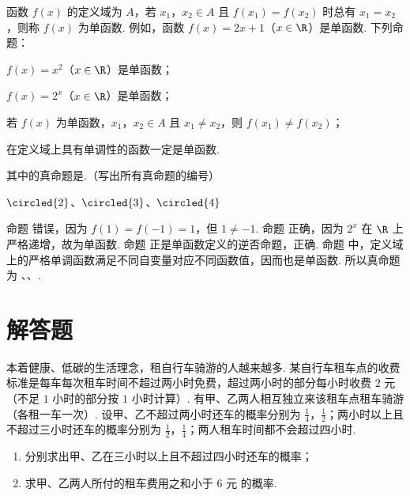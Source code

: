 \begin{problem}
函数 \(f(x)\) 的定义域为 \(A\)，若 \(x_1\)，\(x_2 \in A\) 且 \(f(x_1) = f(x_2)\) 时总有 \(x_1 = x_2\)，则称 \(f(x)\) 为单函数. 例如，函数 \(f(x) = 2x + 1\)（\(x \in \R\)）是单函数. 下列命题：

\begin{circlelist}
\item \(f(x) = x^2\)（\(x \in \R\)）是单函数；
\item \(f(x) = 2^x\)（\(x \in \R\)）是单函数；
\item 若 \(f(x)\) 为单函数，\(x_1\)，\(x_2 \in A\) 且 \(x_1 \neq x_2\)，则 \(f(x_1) \neq f(x_2)\)；
\item 在定义域上具有单调性的函数一定是单函数.
\end{circlelist}

其中的真命题是\fillinblank{}.（写出所有真命题的编号）
\end{problem}

\begin{answer}
\(\circled{2}\)、\(\circled{3}\)、\(\circled{4}\)
\end{answer}

\begin{solution}
命题  错误，因为 \(f(1)=f(-1)=1\)，但 \(1\ne-1\). 命题  正确，因为 \(2^x\) 在 \(\R\) 上严格递增，故为单函数. 命题  正是单函数定义的逆否命题，正确. 命题  中，定义域上的严格单调函数满足不同自变量对应不同函数值，因而也是单函数. 所以真命题为 、、.
\end{solution}

\section{解答题}

\begin{problem}
本着健康、低碳的生活理念，租自行车骑游的人越来越多. 某自行车租车点的收费标准是每车每次租车时间不超过两小时免费，超过两小时的部分每小时收费 \(2\text{ 元}\)（不足 \(1\) 小时的部分按 \(1\) 小时计算）. 有甲、乙两人相互独立来该租车点租车骑游（各租一车一次）. 设甲、乙不超过两小时还车的概率分别为 \(\frac{1}{4}\)，\(\frac{1}{2}\)；两小时以上且不超过三小时还车的概率分别为 \(\frac{1}{2}\)，\(\frac{1}{4}\)；两人租车时间都不会超过四小时.
\begin{enumerate}
\item 分别求出甲、乙在三小时以上且不超过四小时还车的概率；
\item 求甲、乙两人所付的租车费用之和小于 \(6\text{ 元}\) 的概率.
\end{enumerate}
\end{problem}

